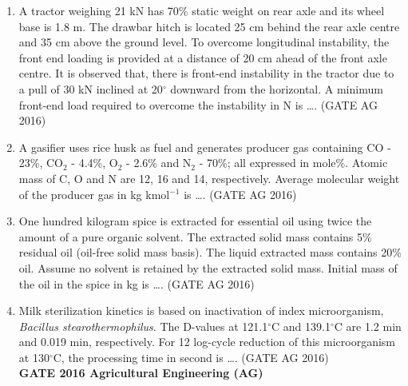 \documentclass[journal]{IEEEtran}
\begin{document}
\begin{enumerate}
\medskip

\item 
A tractor weighing 21 kN has 70\% static weight on rear axle and its wheel base is 1.8 m. The drawbar hitch is located 25 cm behind the rear axle centre and 35 cm above the ground level. To overcome longitudinal instability, the front end loading is provided at a distance of 20 cm ahead of the front axle centre. It is observed that, there is front-end instability in the tractor due to a pull of 30 kN inclined at 20$^\circ$ downward from the horizontal. A minimum front-end load required to overcome the instability in N is \dots.
\hfill(GATE AG 2016)\\

\medskip

\item 
A gasifier uses rice husk as fuel and generates producer gas containing CO - 23\%, CO$_2$ - 4.4\%, O$_2$ - 2.6\% and N$_2$ - 70\%; all expressed in mole\%. Atomic mass of C, O and N are 12, 16 and 14, respectively. Average molecular weight of the producer gas in kg kmol$^{-1}$ is \dots.
\hfill(GATE AG 2016)\\

\medskip

\item 
One hundred kilogram spice is extracted for essential oil using twice the amount of a pure organic solvent. The extracted solid mass contains 5\% residual oil (oil-free solid mass basis). The liquid extracted mass contains 20\% oil. Assume no solvent is retained by the extracted solid mass. Initial mass of the oil in the spice in kg is \dots.
\hfill(GATE AG 2016)\\


\medskip

\item 
Milk sterilization kinetics is based on inactivation of index microorganism, \textit{Bacillus stearothermophilus}. The D-values at 121.1$^\circ$C and 139.1$^\circ$C are 1.2 min and 0.019 min, respectively. For 12 log-cycle reduction of this microorganism at 130$^\circ$C, the processing time in second is \dots.
\hfill(GATE AG 2016)\\

\textbf{GATE 2016 Agricultural Engineering (AG)}


\end{enumerate}
\end{document}
